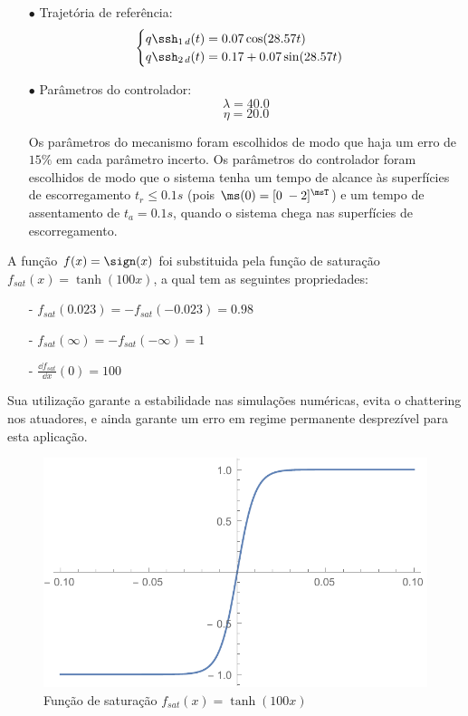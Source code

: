 \documentclass[]{politex}
\begin{document}
\begin{itemize}
\begin{itemize}
\item[$\bullet$] Trajetória de referência:
\begin{equation}
\begin{cases}
q\ssh_{1 \, d}(t) = 0.07 \cos(28.57 t) \\
q\ssh_{2 \, d}(t) = 0.17 + 0.07 \sin(28.57 t) \\
\end{cases}
\end{equation}

\item[$\bullet$] Parâmetros do controlador:
$$ \lambda = 40.0 $$
$$ \eta = 20.0 $$

Os parâmetros do mecanismo foram escolhidos de modo que haja um erro de $15\%$ em cada parâmetro incerto.
Os parâmetros do controlador foram escolhidos de modo que o sistema tenha um tempo de alcance às superfícies de escorregamento $t_r  \leq 0.1 s$ (pois $\ms(0) = [0 \; -2]^\msT$) e um tempo de assentamento de $t_a = 0.1 s$, quando o sistema chega nas superfícies de escorregamento. \\
\end{itemize}

A função $f(x) = \sign(x)$ foi substituida pela função de saturação $f_{sat}(x) = \tanh(100 x)$, a qual tem as seguintes propriedades:
\begin{itemize}
\item[-] $f_{sat}(0.023) = -f_{sat}(-0.023) = 0.98$
\item[-] $f_{sat}(\infty) = -f_{sat}(-\infty) = 1$
\item[-] $ \frac{\dd f_{sat}}{\dd x} (0) = 100$
\end{itemize}

Sua utilização garante a estabilidade nas simulações numéricas, evita o chattering nos atuadores, e ainda garante um erro em regime permanente desprezível para esta aplicação.

\begin{figure}[h]
	\centering
	\includegraphics[scale=0.4]{../figures/Tanh.pdf}  
	\caption{Função de saturação $f_{sat}(x) = \tanh(100 x)$}
	\label{fig:Tanh}
\end{figure}

\end{itemize}
\end{document}
